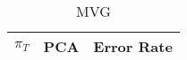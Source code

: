 \begin{center}
\begin{longtable}{|c|c|c|}
\caption{MVG}\label{tab:mvg_acctable}\\
\hline
$\pi_T$ & PCA & Error Rate\\
\hline
\hline
\end{longtable}
\end{center}
